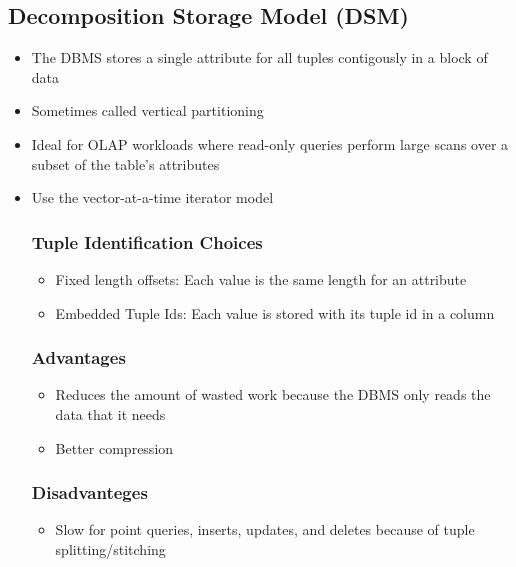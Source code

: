 \documentclass[11pt]{article}
\begin{document}
    \subsection*{Decomposition Storage Model (DSM)}
    \begin{itemize}
        \item The DBMS stores a single attribute for all tuples contigously in a block of data
        \item Sometimes called vertical partitioning
        \item Ideal for OLAP workloads where read-only queries perform large scans over a subset of the table's attributes
        \item Use the vector-at-a-time iterator model

        \subsubsection*{Tuple Identification Choices}
        \begin{itemize}
            \item Fixed length offsets: Each value is the same length for an attribute
            \item Embedded Tuple Ids: Each value is stored with its tuple id in a column
        \end{itemize}
        \subsubsection*{Advantages}
        \begin{itemize}
            \item Reduces the amount of wasted work because the DBMS only reads the data that it needs
            \item Better compression
        \end{itemize}
        \subsubsection*{Disadvanteges}
        \begin{itemize}
            \item Slow for point queries, inserts, updates, and deletes because of tuple splitting/stitching
        \end{itemize}
    \end{itemize}
\end{document}
